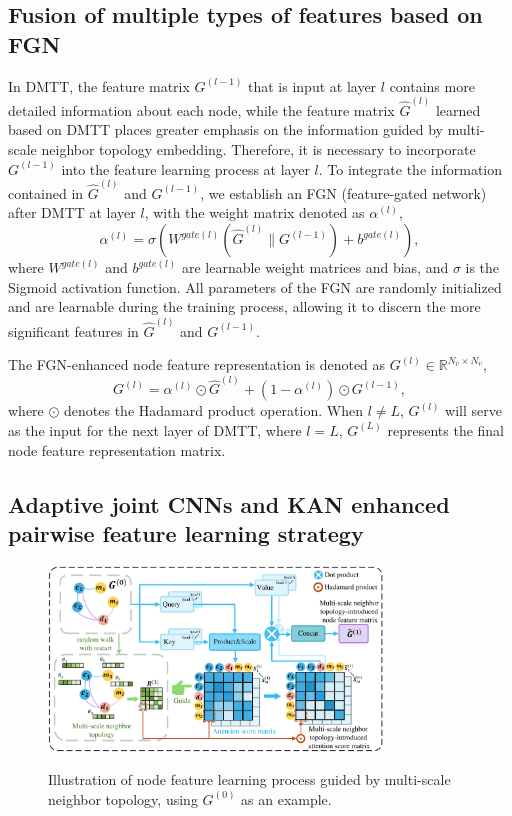 \documentclass[journal,twoside,web]{ieeecolor}
\begin{document}
\subsection{Fusion of multiple types of features based on FGN}
In DMTT, the feature matrix ${G}^{(l - 1)}$ that is input at layer $l$ contains more detailed information about each node, while the feature matrix $\hat{G}^{(l)}$ learned based on DMTT places greater emphasis on the information guided by multi-scale neighbor topology embedding. Therefore, it is necessary to incorporate ${G}^{(l - 1)}$ into the feature learning process at layer $l$. To integrate the information contained in $\hat{G}^{(l)}$ and $G^{(l - 1)}$, we establish an FGN (feature-gated network) after DMTT at layer $l$, with the weight matrix denoted as $\alpha^{(l)}$,
\begin{equation}
    \alpha^{(l)} = \sigma (W^{gate(l)}(\hat{G}^{(l)}\| G^{(l - 1)}) + b^{gate(l)}),
\end{equation}
where $W^{gate(l)}$ and $b^{gate(l)}$ are learnable weight matrices and bias, and $\sigma$ is the Sigmoid activation function. All parameters of the FGN are randomly initialized and are learnable during the training process, allowing it to discern the more significant features in $\hat{G}^{(l)}$ and $G^{(l - 1)}$.

The FGN-enhanced node feature representation is denoted as ${G}^{(l)} \in \mathbb{R}^{N_v \times N_v}$,
\begin{equation}
    {G}^{(l)} =  \alpha^{(l)} \odot \hat{G}^{(l)} + (1 - \alpha^{(l)}) \odot G^{(l - 1)},
\end{equation}
where $\odot$ denotes the Hadamard product operation. When $l \neq L$, $G^{(l)}$ will serve as the input for the next layer of DMTT, where $l = L$, $G^{(L)}$ represents the final node feature representation matrix.



\subsection{Adaptive joint CNNs and KAN enhanced pairwise feature learning strategy}

\begin{figure}
    \centering
    \includegraphics[width=3.5in]{fig/visio4.pdf}\\       
	\caption{Illustration of node feature learning process guided by multi-scale neighbor topology, using $G^{(0)}$ as an example.}
    \label{fig:visio4}
	\vspace{-0.4cm}
\end{figure}
\end{document}
